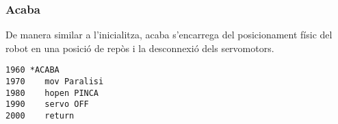 \subsubsection{Acaba}
De manera similar a l'inicialitza, acaba s'encarrega del posicionament
físic del robot en una posició de repòs i la desconnexió dels servomotors.

\begin{verbatim}
1960 *ACABA
1970    mov Paralisi
1980    hopen PINCA
1990    servo OFF
2000    return
\end{verbatim}

